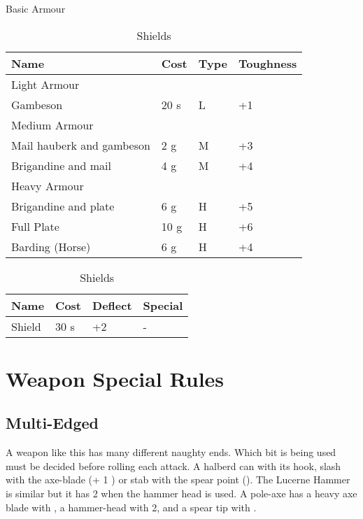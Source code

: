 \begin{table}[ht]
	\centering
	\caption{Basic Armour}
	\begin{tabular}{|l|l|l|l|}
		\hline
		Name  & Cost & Type & Toughness\\
		\hline
		Light Armour & & &  \\
		\hline
		Gambeson & 20 s & L & +1  \\
		\hline
		Medium Armour & & &  \\
		\hline
		Mail hauberk and gambeson & 2 g & M & +3   \\ 
		Brigandine and mail  & 4 g & M & +4  \\
		\hline
		Heavy Armour & & &  \\
		\hline
		Brigandine and plate & 6 g & H & +5 \\
		Full Plate  & 10 g & H & +6  \\
		\hline
		Barding (Horse)& 6 g & H & +4 \\
		\hline
	\end{tabular}
	\caption{Shields}
	\begin{tabular}{|l|l|l|l|}
		\hline
		Name & Cost & Deflect & Special\\   
		\hline
		Shield & 30 s & +2 & - \\
		\hline
	\end{tabular}
\end{table}





\section{Weapon Special Rules}

\subsection{Multi-Edged}
A weapon like this has many different naughty ends. Which bit is being used must be decided before rolling each attack. A halberd can  with its hook, slash with the axe-blade (+ 1 ) or stab with the spear point (). The Lucerne Hammer is similar but it has  2 when the hammer head is used. A pole-axe has a heavy axe blade with , a hammer-head with  2, and a spear tip with .

